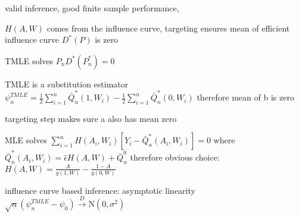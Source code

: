 \documentclass[8pt,oneside]{extarticle}
\begin{document}
\begin{multicols}{2}
valid inference, good finite sample performance, 


$H(A,W)$ comes from the influence curve, targeting ensures mean of efficient influence curve $D^*(P)$  is zero

TMLE solves $P_nD^*(P^*_n)=0$



TMLE is a substitution estimator $\psi_n^{TMLE} = \frac{1}{2}\sum_{i=1}^n \bar{Q}^*_n(1,W_i) - \frac{1}{2}\sum_{i=1}^n \bar{Q}^*_n(0,W_i)$ therefore mean of b is zero

targeting step makes sure a also has mean zero



MLE solves $\sum_{i=1}^n H(A_i, W_i)\left[Y_i-\bar{Q}^*_n(A_i,W_i)\right]=0$ where $\bar{Q}^*_n(A_i,W_i) = \hat{\epsilon}H(A,W) + \bar{Q}^0_n$
 therefore obvious choice: $H(A,W) = \frac{A}{g(1,W)} - \frac{1-A}{g(0,W)}$
 
 
 influence curve based inference: 
 asymptotic linearity $\sqrt{n}\left(\psi_n^{TMLE} - \psi_0\right) \overset{D}{\rightarrow} \mathrm{N}(0,\sigma^2)$
 


\end{multicols}




\end{document}
